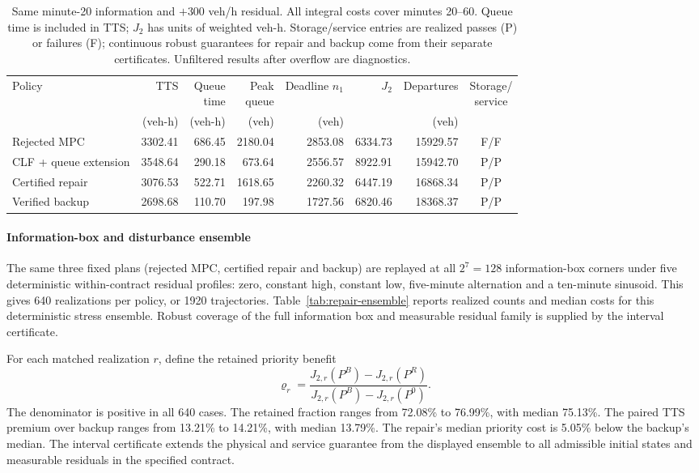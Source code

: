 \documentclass[preprint,12pt]{elsarticle}
\numberwithin{equation}{section}
\begin{document}
\begin{table}[t]
\centering\footnotesize
\caption{Same minute-20 information and $+300$ veh/h residual. All integral
costs cover minutes 20--60. Queue time is included in TTS; $J_2$ has units
of weighted veh-h. Storage/service entries are realized passes (P) or
failures (F); continuous robust guarantees for repair and backup come from
their separate certificates. Unfiltered results after overflow are diagnostics.}
\label{tab:repair-witness}
\setlength{\tabcolsep}{2pt}
\begin{tabular}{@{}lrrrrrrc@{}}
\toprule
Policy & TTS & \shortstack{Queue\\time} & \shortstack{Peak\\queue} & \shortstack{Deadline\\$n_1$} & $J_2$ & Departures & \shortstack{Storage/\\service}\\
 & (veh-h) & (veh-h) & (veh) & (veh) & & (veh) &\\
\midrule
Rejected MPC & 3302.41 & 686.45 & 2180.04 & 2853.08 & 6334.73 & 15929.57 & F/F\\
CLF + queue extension & 3548.64 & 290.18 & 673.64 & 2556.57 & 8922.91 & 15942.70 & P/P\\
Certified repair & 3076.53 & 522.71 & 1618.65 & 2260.32 & 6447.19 & 16868.34 & P/P\\
Verified backup & 2698.68 & 110.70 & 197.98 & 1727.56 & 6820.46 & 18368.37 & P/P\\
\bottomrule
\end{tabular}
\end{table}

\paragraph{Information-box and disturbance ensemble}
The same three fixed plans (rejected MPC, certified repair and backup) are
replayed at all $2^7=128$ information-box corners under five deterministic
within-contract residual profiles: zero, constant high, constant low,
five-minute alternation and a ten-minute sinusoid. This gives 640
realizations per policy, or 1920 trajectories. Table~\ref{tab:repair-ensemble}
reports realized counts and median costs for this deterministic stress
ensemble. Robust coverage of the full information box and measurable residual
family is supplied by the interval certificate.

For each matched realization $r$, define the retained priority benefit
\begin{equation}
\varrho_r=\frac{J_{2,r}(P^B)-J_{2,r}(P^R)}
                 {J_{2,r}(P^B)-J_{2,r}(P^0)}.
\label{eq:repair-benefit}
\end{equation}
The denominator is positive in all 640 cases. The retained fraction ranges
from 72.08\% to 76.99\%, with median 75.13\%. The paired TTS premium
over backup ranges from 13.21\% to 14.21\%, with median 13.79\%.
The repair's median priority cost is 5.05\% below the backup's median.
The interval certificate extends the physical and service guarantee from the
displayed ensemble to all admissible initial states and measurable residuals
in the specified contract.
\end{document}
